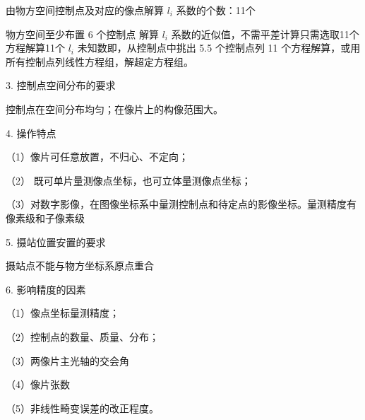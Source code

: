 \documentclass[a4paper]{ctexart}
\begin{document}
由物方空间控制点及对应的像点解算 $l_i$ 系数的个数：11个

物方空间至少布置 6 个控制点 解算 $l_i$ 系数的近似值，不需平差计算只需选取11个方程解算11个 $l_i$ 未知数即，从控制点中挑出 5.5 个控制点列 11 个方程解算，或用所有控制点列线性方程组，解超定方程组。

3. 控制点空间分布的要求

控制点在空间分布均匀；在像片上的构像范围大。

4. 操作特点

（1）像片可任意放置，不归心、不定向；

（2） 既可单片量测像点坐标，也可立体量测像点坐标；

（3）对数字影像，在图像坐标系中量测控制点和待定点的影像坐标。量测精度有像素级和子像素级

5. 摄站位置安置的要求

摄站点不能与物方坐标系原点重合

6. 影响精度的因素

（1）像点坐标量测精度；

（2）控制点的数量、质量、分布；

（3）两像片主光轴的交会角

（4）像片张数

（5）非线性畸变误差的改正程度。
\end{document}
